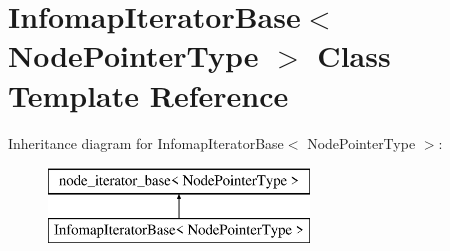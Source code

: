 \hypertarget{classInfomapIteratorBase}{}\section{Infomap\+Iterator\+Base$<$ Node\+Pointer\+Type $>$ Class Template Reference}
\label{classInfomapIteratorBase}
Inheritance diagram for Infomap\+Iterator\+Base$<$ Node\+Pointer\+Type $>$\+:\begin{figure}[H]
\begin{center}
\leavevmode
\includegraphics[height=2.000000cm]{classInfomapIteratorBase}
\end{center}
\end{figure}
